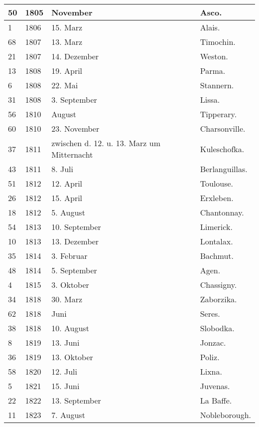 \documentclass[a4paper, 11pt, oneside, polutonikogreek, german]{article}
\begin{document}
\begin{center}
\begin{longtable}{|p{6mm}|p{9mm}|p{60mm}|p{27mm}|}
        50 & 1805 & November & Asco. \\ \hline
        1 & 1806 & 15. Marz & Alais. \\ \hline
        68 & 1807 & 13. Marz & Timochin. \\ \hline
        21 & 1807 & 14. Dezember & Weston. \\ \hline
        13 & 1808 & 19. April & Parma. \\ \hline
        6 & 1808 & 22. Mai & Stannern. \\ \hline
        31 & 1808 & 3. September & Lissa. \\ \hline
        56 & 1810 & August & Tipperary. \\ \hline
        60 & 1810 & 23. November & Charsonville. \\ \hline
        37 & 1811 & zwischen d. 12. u. 13. Marz um Mitternacht & Kuleschofka. \\ \hline
        43 & 1811 & 8. Juli & Berlanguillas. \\ \hline
        51 & 1812 & 12. April & Toulouse. \\ \hline
        26 & 1812 & 15. April & Erxleben. \\ \hline
        18 & 1812 & 5. August & Chantonnay. \\ \hline
        54 & 1813 & 10. September & Limerick. \\ \hline
        10 & 1813 & 13. Dezember & Lontalax. \\ \hline
        35 & 1814 & 3. Februar & Bachmut. \\ \hline
        48 & 1814 & 5. September & Agen. \\ \hline
        4 & 1815 & 3. Oktober & Chassigny. \\ \hline
        34 & 1818 & 30. Marz & Zaborzika. \\ \hline
        62 & 1818 & Juni & Seres. \\ \hline
        38 & 1818 & 10. August & Slobodka. \\ \hline
        8 & 1819 & 13. Juni & Jonzac. \\ \hline
        36 & 1819 & 13. Oktober & Poliz. \\ \hline
        58 & 1820 & 12. Juli & Lixna. \\ \hline
        5 & 1821 & 15. Juni & Juvenas. \\ \hline
        22 & 1822 & 13. September & La Baffe. \\ \hline
        11 & 1823 & 7. August & Nobleborough. \\ \hline

\end{longtable}
\end{center}
\end{document}
